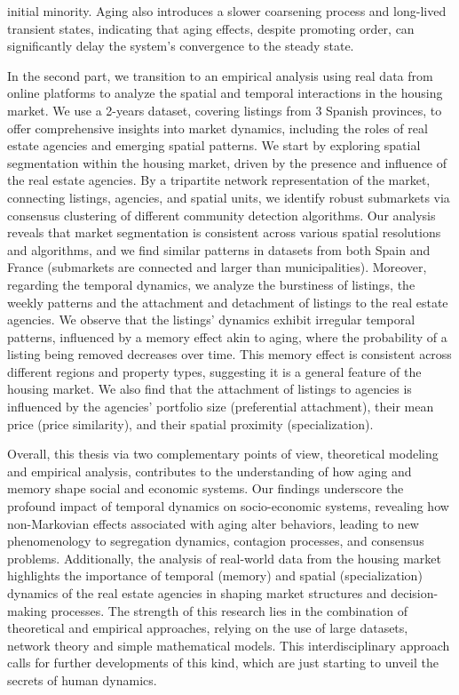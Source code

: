 initial minority. Aging also introduces a slower coarsening process and long-lived transient states, indicating that aging effects, despite promoting order, can significantly delay the system's convergence to the steady state.

In the second part, we transition to an empirical analysis using real data from online platforms to analyze the spatial and temporal interactions in the housing market. We use a 2-years dataset, covering listings from 3 Spanish provinces, to offer comprehensive insights into market dynamics, including the roles of real estate agencies and emerging spatial patterns. We start by exploring spatial segmentation within the housing market, driven by the presence and influence of the real estate agencies. By a tripartite network representation of the market, connecting listings, agencies, and spatial units, we identify robust submarkets via consensus clustering of different community detection algorithms. Our analysis reveals that market segmentation is consistent across various spatial resolutions and algorithms, and we find similar patterns in datasets from both Spain and France (submarkets are connected and larger than municipalities). Moreover, regarding the temporal dynamics, we analyze the burstiness of listings, the weekly patterns and the attachment and detachment of listings to the real estate agencies. We observe that the listings' dynamics exhibit irregular temporal patterns, influenced by a memory effect akin to aging, where the probability of a listing being removed decreases over time. This memory effect is consistent across different regions and property types, suggesting it is a general feature of the housing market. We also find that the attachment of listings to agencies is influenced by the agencies' portfolio size (preferential attachment), their mean price (price similarity), and their spatial proximity (specialization).

\thispagestyle{empty}

Overall, this thesis via two complementary points of view, theoretical modeling and empirical analysis, contributes to the understanding of how aging and memory shape social and economic systems. Our findings underscore the profound impact of temporal dynamics on socio-economic systems, revealing how non-Markovian effects associated with aging alter behaviors, leading to new phenomenology to segregation dynamics, contagion processes, and consensus problems. Additionally, the analysis of real-world data from the housing market highlights the importance of temporal (memory) and spatial (specialization) dynamics of the real estate agencies in shaping market structures and decision-making processes. The strength of this research lies in the combination of theoretical and empirical approaches, relying on the use of large datasets, network theory and simple mathematical models. This interdisciplinary approach calls for further developments of this kind, which are just starting to unveil the secrets of human dynamics.

\vfill